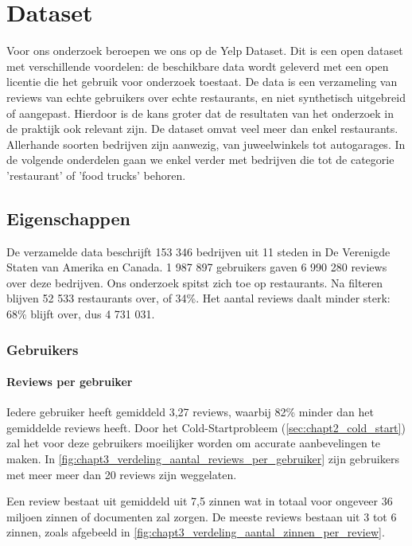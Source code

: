 \chapter{Dataset}
\label{sec:chapt3}

Voor ons onderzoek beroepen we ons op de Yelp Dataset. Dit is een open dataset met verschillende voordelen: de beschikbare data wordt geleverd met een open licentie die het gebruik voor onderzoek toestaat. \cite{Yelp_Dataset} De data is een verzameling van reviews van echte gebruikers over echte restaurants, en niet synthetisch uitgebreid of aangepast. Hierdoor is de kans groter dat de resultaten van het onderzoek in de praktijk ook relevant zijn. De dataset omvat veel meer dan enkel restaurants. Allerhande soorten bedrijven zijn aanwezig, van juweelwinkels tot autogarages. In de volgende onderdelen gaan we enkel verder met bedrijven die tot de categorie 'restaurant' of 'food trucks' behoren. 

\section{Eigenschappen}
\label{sub:chapt3_eigenschappen_dataset}
De verzamelde data beschrijft 153 346 bedrijven uit 11 steden in De Verenigde Staten van Amerika en Canada. 1 987 897 gebruikers gaven 6 990 280 reviews over deze bedrijven. Ons onderzoek spitst zich toe op restaurants. Na filteren blijven 52 533 restaurants over, of 34\%. Het aantal reviews daalt minder sterk: 68\% blijft over, dus 4 731 031.

\subsection{Gebruikers}
\subsubsection{Reviews per gebruiker}
\label{sec:chapt3_reviews_per_gebruiker}
Iedere gebruiker heeft gemiddeld 3,27 reviews, waarbij 82\% minder dan het gemiddelde reviews heeft. Door het Cold-Startprobleem (\ref{sec:chapt2_cold_start}) zal het voor deze gebruikers moeilijker worden om accurate aanbevelingen te maken. In \autoref{fig:chapt3_verdeling_aantal_reviews_per_gebruiker} zijn gebruikers met meer meer dan 20 reviews zijn weggelaten.

Een review bestaat uit gemiddeld uit 7,5 zinnen wat in totaal voor ongeveer 36 miljoen zinnen of documenten zal zorgen. De meeste reviews bestaan uit 3 tot 6 zinnen, zoals afgebeeld in \autoref{fig:chapt3_verdeling_aantal_zinnen_per_review}.

